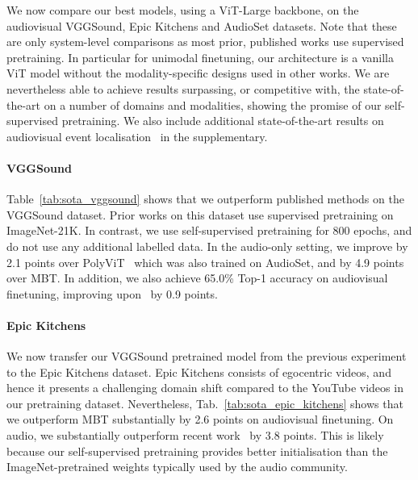 \documentclass[10pt,twocolumn,letterpaper]{article}
\def \paravspace {-1\baselineskip}
\begin{document}
 
We now compare our best models, using a ViT-Large backbone, on the audiovisual VGGSound, Epic Kitchens and AudioSet datasets.
Note that these are only system-level comparisons as most prior, published works use supervised pretraining.
In particular for unimodal finetuning, our architecture is a vanilla ViT model without the modality-specific designs used in other works.
We are nevertheless able to achieve results surpassing, or competitive with, the state-of-the-art on a number of domains and modalities, showing the promise of our self-supervised pretraining.
We also include additional state-of-the-art results on audiovisual event localisation~\cite{tian2018audio} in the supplementary.


\vspace{\paravspace}
\paragraph{VGGSound}

Table~\ref{tab:sota_vggsound} shows that we outperform published methods on the VGGSound dataset. 
Prior works on this dataset use supervised pretraining on ImageNet-21K. In contrast, we use self-supervised pretraining for 800 epochs, and do not use any additional labelled data.
In the audio-only setting, we improve by 2.1 points over PolyViT~\cite{likhosherstov2021polyvit} which was also trained on AudioSet, and by 4.9 points over MBT. 
In addition, we also achieve 65.0\% Top-1 accuracy on audiovisual finetuning, improving upon~\cite{nagrani2021attention} by 0.9 points.

\vspace{\paravspace}
\paragraph{Epic Kitchens}

We now transfer our VGGSound pretrained model from the previous experiment to the Epic Kitchens dataset.
Epic Kitchens consists of egocentric videos, and hence it presents a challenging domain shift compared to the YouTube videos in our pretraining dataset.
Nevertheless, Tab.~\ref{tab:sota_epic_kitchens} shows that we outperform MBT substantially by 2.6 points on audiovisual finetuning.
On audio, we substantially outperform recent work~\cite{stergiou2022play} by 3.8 points.
This is likely because our self-supervised pretraining provides better initialisation than the ImageNet-pretrained weights typically used by the audio community.
\end{document}
